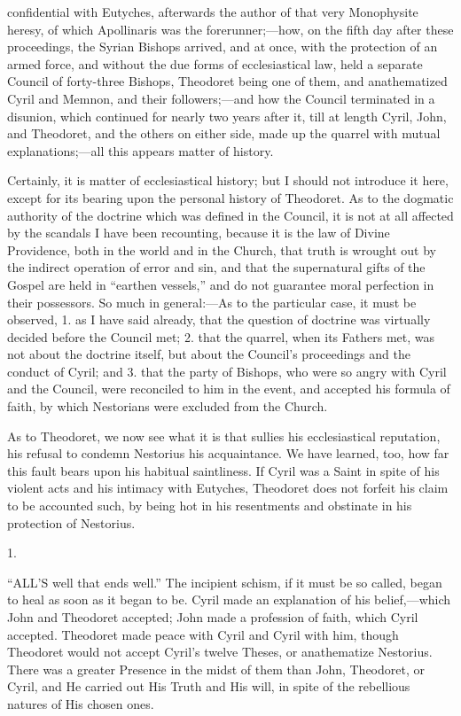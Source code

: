 confidential with Eutyches, afterwards the author of that very
Monophysite heresy, of which Apollinaris was the forerunner;—how, on
the fifth day after these proceedings, the Syrian Bishops arrived, and
at once, with the protection of an armed force, and without the due
forms of ecclesiastical law, held a separate Council of forty-three
Bishops, Theodoret being one of them, and anathematized Cyril
and Memnon, and their followers;—and how the Council terminated in a
disunion, which continued for nearly two years after it, till at
length Cyril, John, and Theodoret, and the others on either side, made
up the quarrel with mutual explanations;—all this appears matter of
history.

Certainly, it is matter of ecclesiastical history; but I should not
introduce it here, except for its bearing upon the personal history of
Theodoret. As to the dogmatic authority of the doctrine which was
defined in the Council, it is not at all affected by the scandals I
have been recounting, because it is the law of Divine Providence, both
in the world and in the Church, that truth is wrought out by the
indirect operation of error and sin, and that the supernatural gifts
of the Gospel are held in ``earthen vessels,'' and do not
guarantee moral perfection in their possessors. So much in general:—As
to the particular case, it must be observed, 1. as I have said
already, that the question of doctrine was virtually decided before
the Council met; 2. that the quarrel, when its Fathers met, was not
about the doctrine itself, but about the Council's proceedings and the
conduct of Cyril; and 3. that the party of Bishops, who were so angry
with Cyril and the Council, were reconciled to him in the event, and
accepted his formula of faith, by which Nestorians were excluded from
the Church.

As to Theodoret, we now see what it is that sullies his
ecclesiastical reputation, his refusal to condemn Nestorius his
acquaintance. We have learned, too, how far this fault bears upon his
habitual saintliness. If Cyril was a Saint in spite of his violent
acts and his intimacy with Eutyches, Theodoret does not forfeit his
claim to be accounted such, by being hot in his resentments and
obstinate in his protection of Nestorius.


1.

``ALL'S well that ends well.'' The
incipient schism, if it must be so called, began to heal as soon as it
began to be. Cyril made an explanation of his belief,—which John and
Theodoret accepted; John made a profession of faith, which Cyril
accepted. Theodoret made peace with Cyril and Cyril with him, though
Theodoret would not accept Cyril's twelve Theses, or anathematize
Nestorius. There was a greater Presence in the midst of them than
John, Theodoret, or Cyril, and He carried out His Truth and His will,
in spite of the rebellious natures of His chosen ones.

